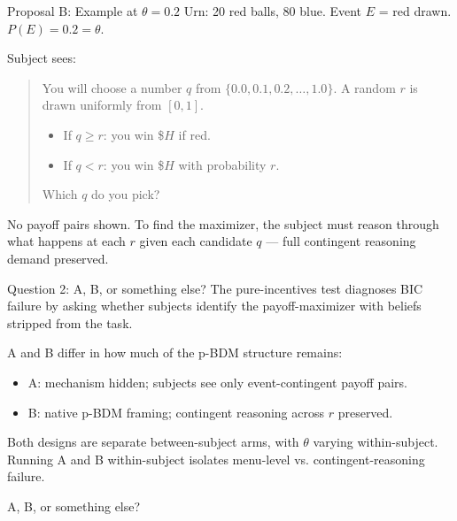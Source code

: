 \documentclass[11pt,aspectratio=169]{beamer}
\begin{document}
\begin{frame}{Proposal B: Example at $\theta = 0.2$}
Urn: 20 red balls, 80 blue. Event $E$ = red drawn. $P(E) = 0.2 = \theta$.

\vspace{0.6em}
Subject sees:

\vspace{0.3em}
\begin{quote}
You will choose a number $q$ from $\{0.0, 0.1, 0.2, \ldots, 1.0\}$. A random $r$ is drawn uniformly from $[0, 1]$.
\begin{itemize}
\item If $q \geq r$: you win \$$H$ if red.
\item If $q < r$: you win \$$H$ with probability $r$.
\end{itemize}
Which $q$ do you pick?
\end{quote}

\vspace{0.3em}
\footnotesize
No payoff pairs shown. To find the maximizer, the subject must reason through what happens at each $r$ given each candidate $q$ --- full contingent reasoning demand preserved.
\end{frame}

\begin{frame}{Question 2: A, B, or something else?}
The pure-incentives test diagnoses BIC failure by asking whether subjects identify the payoff-maximizer with beliefs stripped from the task.

\vspace{0.6em}
A and B differ in how much of the p-BDM structure remains:
\begin{itemize}
\item A: mechanism hidden; subjects see only event-contingent payoff pairs.
\item B: native p-BDM framing; contingent reasoning across $r$ preserved.
\end{itemize}

\vspace{0.4em}
Both designs are separate between-subject arms, with $\theta$ varying within-subject. Running A and B within-subject isolates menu-level vs. contingent-reasoning failure.

\vspace{0.6em}
\begin{block}{}
A, B, or something else?
\end{block}
\end{frame}
\end{document}
